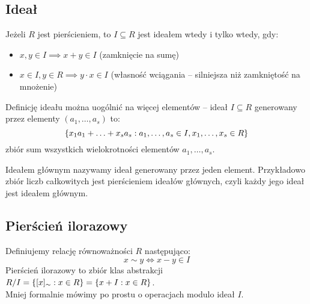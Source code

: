 \subsection{Ideał}
Jeżeli \( R \) jest pierścieniem, to \( I \subseteq R \) jest ideałem wtedy i tylko wtedy, gdy:
\begin{itemize}
    \item \( x, y \in I \implies x + y \in I \) (zamknięcie na sumę)
    \item \( x \in I, y \in R \implies y\cdot x \in I \) (własność wciągania -- silniejsza niż zamkniętość na mnożenie)
\end{itemize}

Definicję ideału można uogólnić na więcej elementów -- ideał \( I \subseteq R \) generowany przez elementy \( (a_1, \ldots, a_s) \) to:
\[
    \set{ x_1 a_1 + \ldots + x_s a_s : a_1, \ldots, a_s \in I, x_1, \ldots, x_s \in R}
\]
zbiór sum wszystkich wielokrotności elementów \( a_1, \ldots, a_s \).

Ideałem głównym nazywamy ideał generowany przez jeden element.
Przykładowo zbiór liczb całkowitych jest pierścieniem ideałów głównych, czyli każdy jego ideał jest ideałem głównym.

\subsection{Pierścień ilorazowy}
Definiujemy relację równoważności \( R \) następująco:
\[
    x \sim y \iff x - y \in I
\]
Pierścień ilorazowy to zbiór klas abstrakcji \( R/I = \set{[x]_{\sim} : x \in R} = \set{x + I : x \in R} \). \\
Mniej formalnie mówimy po prostu o operacjach modulo ideał \( I \).

